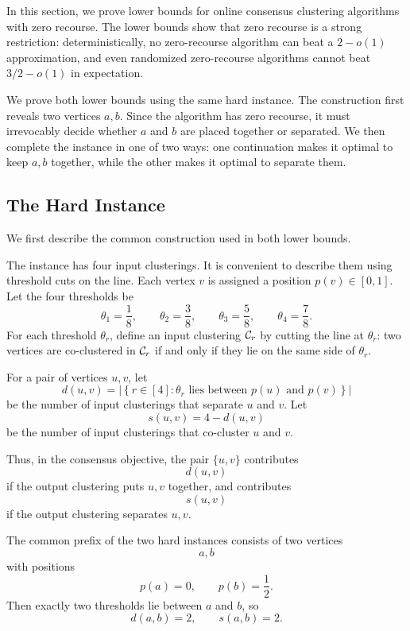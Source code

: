 In this section, we prove lower bounds for online consensus clustering algorithms with zero recourse. The lower bounds show that zero recourse is a strong restriction: deterministically, no zero-recourse algorithm can beat a \(2-o(1)\) approximation, and even randomized zero-recourse algorithms cannot beat \(3/2-o(1)\) in expectation.

We prove both lower bounds using the same hard instance. The construction first reveals two vertices \(a,b\). Since the algorithm has zero recourse, it must irrevocably decide whether \(a\) and \(b\) are placed together or separated. We then complete the instance in one of two ways: one continuation makes it optimal to keep \(a,b\) together, while the other makes it optimal to separate them.

\detzerorecourselb*

\randzerorecourselb*

\subsection{The Hard Instance}

We first describe the common construction used in both lower bounds.

The instance has four input clusterings. It is convenient to describe them using threshold cuts on the line. Each vertex \(v\) is assigned a position \(p(v)\in[0,1]\). Let the four thresholds be
\[
    \theta_1=\frac18,\qquad
    \theta_2=\frac38,\qquad
    \theta_3=\frac58,\qquad
    \theta_4=\frac78.
\]
For each threshold \(\theta_r\), define an input clustering \(\mathcal{C}_r\) by cutting the line at \(\theta_r\): two vertices are co-clustered in \(\mathcal{C}_r\) if and only if they lie on the same side of \(\theta_r\).

For a pair of vertices \(u,v\), let
\[
    d(u,v)
    =
    \left|
    \left\{
        r\in[4]:
        \theta_r
        \text{ lies between }p(u)\text{ and }p(v)
    \right\}
    \right|
\]
be the number of input clusterings that separate \(u\) and \(v\). Let
\[
    s(u,v)=4-d(u,v)
\]
be the number of input clusterings that co-cluster \(u\) and \(v\).

Thus, in the consensus objective, the pair \(\{u,v\}\) contributes
\[
    d(u,v)
\]
if the output clustering puts \(u,v\) together, and contributes
\[
    s(u,v)
\]
if the output clustering separates \(u,v\).

The common prefix of the two hard instances consists of two vertices
\[
    a,b
\]
with positions
\[
    p(a)=0,
    \qquad
    p(b)=\frac12.
\]
Then exactly two thresholds lie between \(a\) and \(b\), so
\[
    d(a,b)=2,
    \qquad
    s(a,b)=2.
\]

